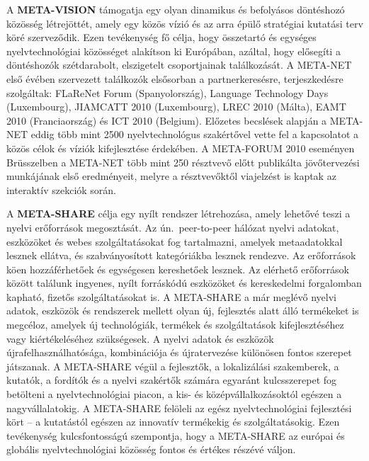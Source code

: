 \begin{multicols}{2}
  A \textbf{META-VISION} támogatja egy olyan dinamikus és befolyásos döntéshozó kö\-zös\-ség létrejöttét, amely egy közös vízió és az arra épülő stratégiai kutatási terv köré szerveződik. Ezen tevékenység fő célja, hogy összetartó és egységes nyelvtechnológiai közösséget alakítson ki Európában, azáltal, hogy elősegíti a döntéshozók szétdarabolt, elszigetelt csoportjainak ta\-lál\-ko\-zá\-sát. A META-NET első évében szer\-ve\-zett találkozók elsősorban a partnerkeresésre, terjeszkedésre szolgáltak: FLaReNet Forum (Spanyolország), Language Technology Days (Luxembourg), JIAMCATT 2010 (Luxembourg), LREC 2010 (Málta), EAMT 2010 (Franciaország) és ICT 2010 (Belgium). Előzetes becs\-lé\-sek alapján a META-NET eddig több mint 2500 nyelvtechnológus szakértővel vette fel a kapcsolatot a közös célok és víziók kifejlesztése érdekében. A META-FORUM 2010 eseményen Brüsszelben a META-NET több mint 250 résztvevő előtt publikálta jövőtervezési munkájának első eredményeit, melyre a résztvevőktől via\-jel\-zést is kaptak az interaktív szekciók során. 

  A \textbf{META-SHARE} célja egy nyílt rendszer létrehozása, amely lehetővé teszi a nyelvi erőforrások megosztását. Az ún.\ peer-to-peer hálózat nyelvi adatokat, eszközöket és webes szolgáltatásokat fog tartalmazni, amelyek metaadatokkal lesznek ellátva, és szabványosított kategóriákba lesznek rendezve. Az erőforrások köen hozzáférhetőek és egységesen kereshetőek lesznek. Az elérhető erőforrások között találunk ingyenes, nyílt forráskódú eszközöket és kereskedelmi forgalomban kapható, fizetős szolgáltatásokat is. A META-SHARE a már meg\-lé\-vő nyelvi adatok, eszközök és rendszerek mellett olyan új, fejlesztés alatt álló termékeket is megcéloz, amelyek új technológiák, termékek és szolgáltatások kifejlesztéséhez vagy kiértékeléséhez szükségesek. A nyelvi adatok és eszközök újrafelhasználhatósága, kombinációja és újratervezése különösen fontos szerepet játszanak. A META-SHARE végül a fej\-lesz\-tők, a lokalizálási szakemberek, a kutatók, a fordítók és a nyelvi szakértők számára egyaránt kulcsszerepet fog betölteni a nyelvtechnológiai piacon, a kis- és középvállalkozásoktól egészen a nagyvállalatokig. A META-SHARE felöleli az egész nyelvtechnológiai fejlesztési kört -- a kutatástól egészen az innovatív termékekig és szolgáltatásokig. Ezen te\-vé\-keny\-ség kulcsfontosságú szempontja, hogy a META-SHARE az európai és globális nyelvtechnológiai közösség fontos és értékes részévé váljon.  


\end{multicols}
